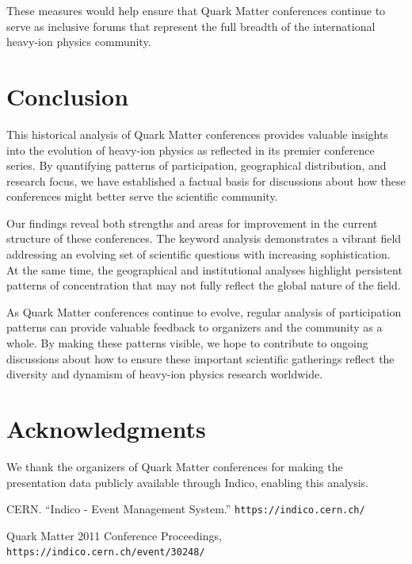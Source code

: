 \documentclass[a4paper,11pt]{article}
\begin{document}
These measures would help ensure that Quark Matter conferences continue to serve as inclusive forums that represent the full breadth of the international heavy-ion physics community.

\section{Conclusion}

This historical analysis of Quark Matter conferences provides valuable insights into the evolution of heavy-ion physics as reflected in its premier conference series. By quantifying patterns of participation, geographical distribution, and research focus, we have established a factual basis for discussions about how these conferences might better serve the scientific community.

Our findings reveal both strengths and areas for improvement in the current structure of these conferences. The keyword analysis demonstrates a vibrant field addressing an evolving set of scientific questions with increasing sophistication. At the same time, the geographical and institutional analyses highlight persistent patterns of concentration that may not fully reflect the global nature of the field.

As Quark Matter conferences continue to evolve, regular analysis of participation patterns can provide valuable feedback to organizers and the community as a whole. By making these patterns visible, we hope to contribute to ongoing discussions about how to ensure these important scientific gatherings reflect the diversity and dynamism of heavy-ion physics research worldwide.

\section{Acknowledgments}

We thank the organizers of Quark Matter conferences for making the presentation data publicly available through Indico, enabling this analysis.


\begin{thebibliography}{9}
CERN. ``Indico - Event Management System.'' 
\texttt{https://indico.cern.ch/}

Quark Matter 2011 Conference Proceedings,
\texttt{https://indico.cern.ch/event/30248/}

\end{thebibliography}
\end{document}
